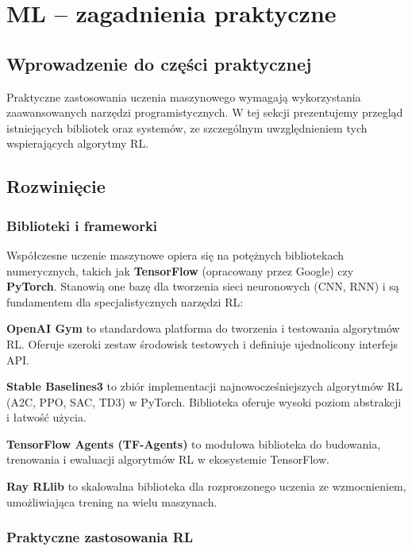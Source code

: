 \documentclass[12pt,a4paper]{article}
\begin{document}
\newpage

\section{ML -- zagadnienia praktyczne}

\subsection{Wprowadzenie do części praktycznej}

Praktyczne zastosowania uczenia maszynowego wymagają wykorzystania zaawansowanych narzędzi programistycznych. W tej sekcji prezentujemy przegląd istniejących bibliotek oraz systemów, ze szczególnym uwzględnieniem tych wspierających algorytmy RL.

\subsection{Rozwinięcie}

\subsubsection{Biblioteki i frameworki}

Współczesne uczenie maszynowe opiera się na potężnych bibliotekach numerycznych, takich jak \textbf{TensorFlow} (opracowany przez Google) czy \textbf{PyTorch}. Stanowią one bazę dla tworzenia sieci neuronowych (CNN, RNN) i są fundamentem dla specjalistycznych narzędzi RL:

\textbf{OpenAI Gym} to standardowa platforma do tworzenia i testowania algorytmów RL. Oferuje szeroki zestaw środowisk testowych i definiuje ujednolicony interfejs API.

\textbf{Stable Baselines3} to zbiór implementacji najnowocześniejszych algorytmów RL (A2C, PPO, SAC, TD3) w PyTorch. Biblioteka oferuje wysoki poziom abstrakcji i łatwość użycia.

\textbf{TensorFlow Agents (TF-Agents)} to modułowa biblioteka do budowania, trenowania i ewaluacji algorytmów RL w ekosystemie TensorFlow.

\textbf{Ray RLlib} to skalowalna biblioteka dla rozproszonego uczenia ze wzmocnieniem, umożliwiająca trening na wielu maszynach.

\subsubsection{Praktyczne zastosowania RL}
\end{document}
